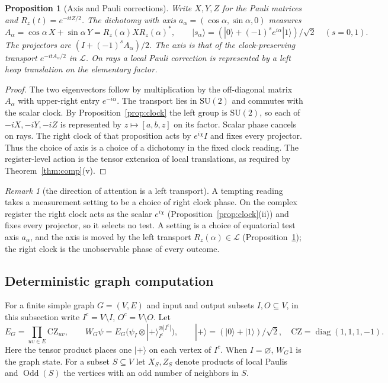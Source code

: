 \documentclass[aps,pra,onecolumn,superscriptaddress,nofootinbib,10pt]{revtex4-2}
\newtheorem{proposition}[theorem]{Proposition}
\theoremstyle{definition}
\theoremstyle{remark}
\newtheorem{remark}[theorem]{Remark}
\newcommand{\cL}{\mathcal{L}}
\newcommand{\SU}{\mathrm{SU}}
\begin{document}
\begin{proposition}[Axis and Pauli corrections]\label{cp:axis}
Write $X,Y,Z$ for the Pauli matrices and $R_z(t)=e^{-itZ/2}$. The dichotomy with axis $a_\alpha=(\cos\alpha,\sin\alpha,0)$ measures
\[
 A_\alpha=\cos\alpha\,X+\sin\alpha\,Y
 =R_z(\alpha)X R_z(\alpha)^*,\qquad
 |s_\alpha\rangle=(|0\rangle+(-1)^se^{i\alpha}|1\rangle)/\sqrt2
 \quad(s=0,1).
\]
The projectors are $(I+(-1)^sA_\alpha)/2$. The axis is that of the clock-preserving transport $e^{-itA_\alpha/2}$ in $\mathcal L$. On rays a local Pauli correction is represented by a left heap translation on the elementary factor.
\end{proposition}
\begin{proof}
The two eigenvectors follow by multiplication by the off-diagonal matrix $A_\alpha$ with upper-right entry $e^{-i\alpha}$. The transport lies in $\SU(2)$ and commutes with the scalar clock. By Proposition~\ref{prop:clock} the left group is $\SU(2)$, so each of $-iX,-iY,-iZ$ is represented by $z\mapsto[a,b,z]$ on its factor. Scalar phase cancels on rays. The right clock of that proposition acts by $e^{i\chi}I$ and fixes every projector. Thus the choice of axis is a choice of a dichotomy in the fixed clock reading. The register-level action is the tensor extension of local translations, as required by Theorem~\ref{thm:comp}(v).
\end{proof}

\begin{remark}[the direction of attention is a left transport]\label{rem:cpattention}
A tempting reading takes a measurement setting to be a choice of right clock phase.  On the complex
register the right clock acts as the scalar $e^{i\chi}$ (Proposition~\ref{prop:clock}(ii)) and fixes every projector, so it selects no
test.  A setting is a choice of equatorial test axis $a_\alpha$, and the axis is moved by the left transport $R_z(\alpha)\in\cL$
(Proposition~\ref{cp:axis}); the right clock is the unobservable phase of every outcome.
\end{remark}

\subsection{Deterministic graph computation}

For a finite simple graph $G=(V,E)$ and input and output subsets $I,O\subseteq V$, in this subsection write $I^c=V\setminus I$, $O^c=V\setminus O$. Let
\[
 E_G=\prod_{uv\in E}\mathrm{CZ}_{uv},\qquad
 W_G\psi=E_G(\psi_I\otimes |+\rangle_{I^c}^{\otimes |I^c|}),\qquad
 |+\rangle=(|0\rangle+|1\rangle)/\sqrt2,\quad
 \mathrm{CZ}=\operatorname{diag}(1,1,1,-1).
\]
Here the tensor product places one $|+\rangle$ on each vertex of $I^c$. When $I=\varnothing$, $W_G1$ is the graph state. For a subset $S\subseteq V$ let $X_S,Z_S$ denote products of local Paulis and $\operatorname{Odd}(S)$ the vertices with an odd number of neighbors in $S$.
\end{document}
